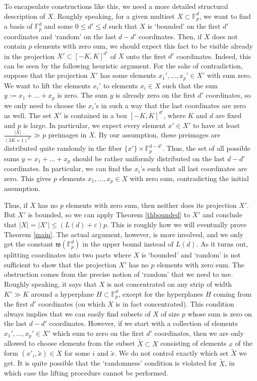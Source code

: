 \documentclass{daj}
\renewcommand{\le}{\leqslant}
\newcommand{\w}{\mathfrak w}
\newcommand{\FF}{\mathbb F}
\theoremstyle{definition}
\theoremstyle{remark}
\theoremstyle{definition}
\theoremstyle{definition}
\begin{document}
To encapsulate constructions like this, we need a more detailed structural description of $X$.
Roughly speaking, for a given multiset $X \subset \FF_p^d$, we want to find a basis of $\FF_p^d$ and some $0\le d' \le d$ such that $X$ is `bounded' on the first $d'$ coordinates and `random' on the last $d-d'$ coordinates. Then, if $X$ does not contain $p$ elements with zero sum, we should expect this fact to be visible already in the projection $X' \subset [-K, K]^{d'}$ of $X$ onto the first $d'$ coordinates.
Indeed, this can be seen by the following heuristic argument. For the sake of contradiction, suppose that the projection $X'$ has some elements $x_1', \ldots, x_p' \in X'$ with sum zero. We want to lift the elements $x_i'$ to elements $x_i \in X$ such that the sum $y := x_1+\ldots +x_p$ is zero. The sum $y$ is already zero on the first $d'$ coordinates, so we only need to choose the $x_i$'s in such a way that the last coordinates are zero as well.
The set $X'$ is contained in a box $[-K, K]^{d'}$, where $K$ and $d$ are fixed and $p$ is large. In particular, we expect every element $x' \in X'$ to have at least $\frac{|X|}{(2K+1)^{d'}} \gg p$ preimages in $X$. By our assumption, these preimages are distributed quite randomly in the fiber $\{x'\} \times \FF_p^{d-d'}$. Thus, the set of all possible sums $y=x_1+\ldots+x_p$ should be rather uniformly distributed on the last $d-d'$ coordinates. In particular, we can find the $x_i$'s such that all last coordinates are zero. This gives $p$ elements $x_1, \ldots, x_p \in X$ with zero sum, contradicting the initial assumption. 

Thus, if $X$ has no $p$ elements with zero sum, then neither does its projection $X'$. But $X'$ is bounded, so we can apply Theorem \ref{thbounded} to $X'$ and conclude that $|X| = |X'| \le (L(d)+\varepsilon) p$. This is roughly how we will eventually prove Theorem \ref{main}. The actual argument, however, is more involved, and we only get the constant $\w(\FF_p^d)$ in the upper bound instead of $L(d)$.
As it turns out, splitting coordinates into two parts where $X$ is `bounded' and `random' is not sufficient to show that the projection $X'$ has no $p$ elements with zero sum. The obstruction comes from the precise notion of `random' that we need to use. Roughly speaking, it says that $X$ is not concentrated on any strip of width $K' \gg K$ around a hyperplane $H \subset \FF_p^d$, except for the hyperplanes $H$ coming from the first $d'$ coordinates (on which $X$ is in fact concentrated). This condition always implies that we can easily find subsets of $X$ of size $p$ whose sum is zero on the last $d-d'$ coordinates.
However, if we start with a collection of elements $x_1', \ldots, x_p' \in X'$ which sum to zero on the first $d'$ coordinates, then we are only allowed to choose elements from the subset $\tilde X \subset X$ consisting of elements $x$ of the form $(x'_i, \tilde x) \in X$ for some $i$ and $\tilde x$. We do not control exactly which set $\tilde X$ we get. It is quite possible that the `randomness' condition is violated for $\tilde X$, in which case the lifting procedure cannot be performed. 
\end{document}
